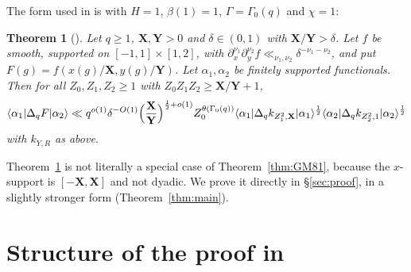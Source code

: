 \documentclass[11pt]{amsart}
\newtheorem{theorem}{Theorem}[section]
\theoremstyle{remark}
\theoremstyle{definition}
\numberwithin{equation}{section}
\newcommand{\br}[1]{\langle #1\rangle}
\newcommand{\bX}{\mathbf{X}}
\newcommand{\bY}{\mathbf{Y}}
\begin{document}
The form used in \cite{II} is \cite[Theorem~2.1]{GM2} with $H=1$, $\beta(1)=1$, $\Gamma=\Gamma_0(q)$ and $\chi=1$:

\begin{theorem}[{\cite[Theorem~6.1]{II}}]\label{thm:II61}
Let $q\ge1$, $\bX,\bY>0$ and $\delta\in(0,1)$ with $\bX/\bY>\delta$. Let $f$ be smooth, supported on $[-1,1]\times[1,2]$, with $\partial_x^{\nu_1}\partial_y^{\nu_2}f\ll_{\nu_1,\nu_2}\delta^{-\nu_1-\nu_2}$, and put $F(g)=f(x(g)/\bX,y(g)/\bY)$. Let $\alpha_1,\alpha_2$ be finitely supported functionals. Then for all $Z_0,Z_1,Z_2\ge1$ with $Z_0Z_1Z_2\ge\bX/\bY+1$,
\[
\br{\alpha_1|\Delta_qF|\alpha_2}\ll q^{o(1)}\delta^{-O(1)}\Bigl(\frac{\bX}{\bY}\Bigr)^{\frac12+o(1)}Z_0^{\theta(\Gamma_0(q))}\br{\alpha_1|\Delta_qk_{Z_1^2,\bX}|\alpha_1}^{\frac12}\br{\alpha_2|\Delta_qk_{Z_2^2,1}|\alpha_2}^{\frac12}
\]
with $k_{Y,R}$ as above.
\end{theorem}

Theorem~\ref{thm:II61} is not literally a special case of Theorem~\ref{thm:GM81}, because the $x$-support is $[-\bX,\bX]$ and not dyadic. We prove it directly in \S\ref{sec:proof}, in a slightly stronger form (Theorem~\ref{thm:main}).

\section{Structure of the proof in \texorpdfstring{\cite{GM1}}{[GM1]}}\label{sec:structure}
\end{document}
